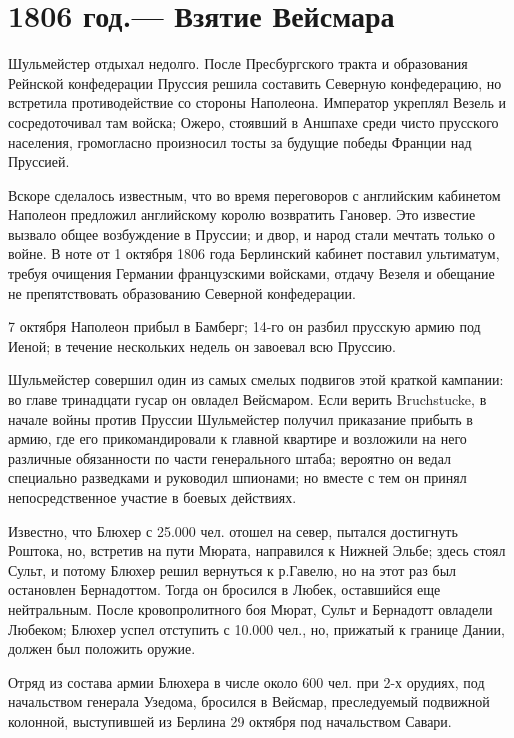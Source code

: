 \documentclass[
  oneside,
  12pt,
  titlepage]{book}
\begin{document}
\hypertarget{ux433ux43eux434.-ux432ux437ux44fux442ux438ux435-ux432ux435ux439ux441ux43cux430ux440ux430}{%
\chapter{1806 год.--- Взятие Вейсмара}\label{ux433ux43eux434.-ux432ux437ux44fux442ux438ux435-ux432ux435ux439ux441ux43cux430ux440ux430}}

Шульмейстер отдыхал недолго. После Пресбургского тракта и образования Рейнской конфедерации Пруссия решила составить Северную конфедерацию, но встретила противодействие со стороны Наполеона. Император укреплял Везель и сосредоточивал там войска; Ожеро, стоявший в Аншпахе среди чисто прусского населения, громогласно произносил тосты за будущие победы Франции над Пруссией.

Вскоре сделалось известным, что во время переговоров с английским кабинетом Наполеон предложил английскому королю возвратить Гановер. Это известие вызвало общее возбуждение в Пруссии; и двор, и народ стали мечтать только о войне. В ноте от 1 октября 1806 года Берлинский кабинет поставил ультиматум, требуя очищения Германии французскими войсками, отдачу Везеля и обещание не препятствовать образованию Северной конфедерации.

7 октября Наполеон прибыл в Бамберг; 14-го он разбил прусскую армию под Иеной; в течение нескольких недель он завоевал всю Пруссию.

Шульмейстер совершил один из самых смелых подвигов этой краткой кампании: во главе тринадцати гусар он овладел Вейсмаром. Если верить Bruchstucke, в начале войны против Пруссии Шульмейстер получил приказание прибыть в армию, где его прикомандировали к главной квартире и возложили на него различные обязанности по части генерального штаба; вероятно он ведал специально разведками и руководил шпионами; но вместе с тем он принял непосредственное участие в боевых действиях.

Известно, что Блюхер с 25.000 чел. отошел на север, пытался достигнуть Роштока, но, встретив на пути Мюрата, направился к Нижней Эльбе; здесь стоял Сульт, и потому Блюхер решил вернуться к р.Гавелю, но на этот раз был остановлен Бернадоттом. Тогда он бросился в Любек, оставшийся еще нейтральным. После кровопролитного боя Мюрат, Сульт и Бернадотт овладели Любеком; Блюхер успел отступить с 10.000 чел., но, прижатый к границе Дании, должен был положить оружие.

Отряд из состава армии Блюхера в числе около 600 чел. при 2-х орудиях, под начальством генерала Узедома, бросился в Вейсмар, преследуемый подвижной колонной, выступившей из Берлина 29 октября под начальством Савари.
\end{document}
